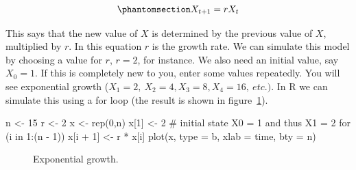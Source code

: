\documentclass[
  a4paper,
  DIV=11,
  numbers=noendperiod,
  oneside]{scrreprt}
\newenvironment{Shaded}{}{}
\newcommand{\AttributeTok}[1]{\textcolor[rgb]{0.84,0.23,0.29}{#1}}
\newcommand{\CommentTok}[1]{\textcolor[rgb]{0.42,0.45,0.49}{#1}}
\newcommand{\ControlFlowTok}[1]{\textcolor[rgb]{0.84,0.23,0.29}{#1}}
\newcommand{\DecValTok}[1]{\textcolor[rgb]{0.00,0.36,0.77}{#1}}
\newcommand{\FunctionTok}[1]{\textcolor[rgb]{0.44,0.26,0.76}{#1}}
\newcommand{\NormalTok}[1]{\textcolor[rgb]{0.14,0.16,0.18}{#1}}
\newcommand{\OtherTok}[1]{\textcolor[rgb]{0.44,0.26,0.76}{#1}}
\newcommand{\SpecialCharTok}[1]{\textcolor[rgb]{0.00,0.36,0.77}{#1}}
\newcommand{\StringTok}[1]{\textcolor[rgb]{0.01,0.18,0.38}{#1}}
\begin{document}
\begin{equation}\phantomsection\label{eq-ch2-1}{
X_{t + 1} = rX_{t}}\end{equation}

This says that the new value of \(X\) is determined by the previous
value of \(X\), multiplied by \(r\). In this equation \(r\) is the
growth rate. We can simulate this model by choosing a value for \(r\),
\(r=2\), for instance. We also need an initial value, say \(X_{0} = 1.\)
If this is completely new to you, enter some values repeatedly. You will
see exponential growth
(\(X_{1} = 2,\ X_{2} = 4,X_{3} = 8,X_{4} = 16,\ etc.)\). In R we can
simulate this using a for loop (the result is shown in
figure~\ref{fig-ch2-img1}).

\begin{Shaded}
\begin{Highlighting}[]
\NormalTok{n }\OtherTok{\textless{}{-}} \DecValTok{15}
\NormalTok{r }\OtherTok{\textless{}{-}} \DecValTok{2}
\NormalTok{x }\OtherTok{\textless{}{-}} \FunctionTok{rep}\NormalTok{(}\DecValTok{0}\NormalTok{,n)}
\NormalTok{x[}\DecValTok{1}\NormalTok{] }\OtherTok{\textless{}{-}} \DecValTok{2} \CommentTok{\# initial state X0 = 1 and thus X1 = 2}
\ControlFlowTok{for}\NormalTok{ (i }\ControlFlowTok{in} \DecValTok{1}\SpecialCharTok{:}\NormalTok{(n }\SpecialCharTok{{-}} \DecValTok{1}\NormalTok{))}
\NormalTok{  x[i }\SpecialCharTok{+} \DecValTok{1}\NormalTok{] }\OtherTok{\textless{}{-}}\NormalTok{ r }\SpecialCharTok{*}\NormalTok{ x[i]}
\FunctionTok{plot}\NormalTok{(x, }\AttributeTok{type =} \StringTok{\textquotesingle{}b\textquotesingle{}}\NormalTok{, }\AttributeTok{xlab =} \StringTok{\textquotesingle{}time\textquotesingle{}}\NormalTok{, }\AttributeTok{bty =} \StringTok{\textquotesingle{}n\textquotesingle{}}\NormalTok{)}
\end{Highlighting}
\end{Shaded}

\begin{figure}


\caption{\label{fig-ch2-img1}Exponential growth.}

\end{figure}%
\end{document}
